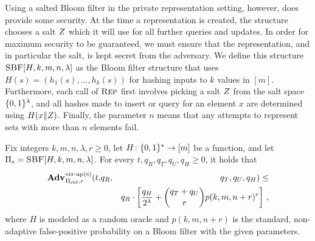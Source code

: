 
Using a salted Bloom filter in the private representation setting, however, does provide some security. At the time a representation is created, the structure chooses a salt $Z$ which it will use for all further queries and updates. In order for maximum security to be guaranteed, we must ensure that the representation, and in particular the salt, is kept secret from the adversary. We define this structure $\textsc{SBF}[H,k,m,n,\lambda]$ as the Bloom filter structure that uses $H(s) = (h_1(s),\ldots,h_k(s))$ for hashing inputs to $k$ values in $[m]$. Furthermore, each call of $\textsc{Rep}$ first involves picking a salt $Z$ from the salt space $\{0,1\}^\lambda$, and all hashes made to insert or query for an element $x$ are determined using $H(x \Vert Z)$. Finally, the parameter $n$ means that any attempts to represent sets with more than $n$ elements fail.

\begin{theorem}\label{thm:bf-priv-salt-bound}
Fix integers $k, m, n, \lambda, r\geq 0$, let $H \colon \{0,1\}^* \to [m]$ be a function, and let $\mathrm{\Pi}_s = \textsc{SBF}[H,k,m,n,\lambda]$.
  For every $t, q_R, q_T, q_U, q_H \geq 0$, it holds that
  \begin{eqnarray*}
    \Adv{\erreps}_{\struct_\saltybloom,r}(t,&q_R,& q_T, q_U, q_H) \leq \\ && q_R \cdot
     \left[
      \frac{q_H}{2^\lambda} +
      {\dbinom{q_T+q_U}{r}} p(k, m, n+r)^r
    \right] \,,
\end{eqnarray*}
where $H$ is modeled as a random oracle and $p(k, m, n+r)$ is the standard, non-adaptive false-positive probability on a Bloom filter with the given parameters.
\end{theorem}

